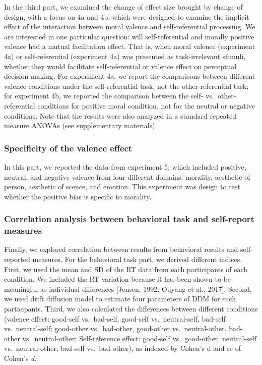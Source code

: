 \documentclass[
  man]{apa6}
\begin{document}
In the third part, we examined the change of effect size brought by change of design, with a focus on 4a and 4b, which were designed to examine the implicit effect of the interaction between moral valence and self-referential processing. We are interested in one particular question: will self-referential and morally positive valence had a mutual facilitation effect. That is, when moral valence (experiment 4a) or self-referential (experiment 4a) was presented as task-irrelevant stimuli, whether they would facilitate self-referential or valence effect on perceptual decision-making. For experiment 4a, we report the comparisons between different valence conditions under the self-referential task, not the other-referential task; for experiment 4b, we reported the comparison between the self- vs.~other-referential conditions for positive moral condition, not for the neutral or negative conditions. Note that the results were also analyzed in a standard repeated measure ANOVAs (see supplementary materials).

\hypertarget{specificity-of-the-valence-effect}{%
\subsubsection{Specificity of the valence effect}\label{specificity-of-the-valence-effect}}

In this part, we reported the data from experiment 5, which included positive, neutral, and negative valence from four different domains: morality, aesthetic of person, aesthetic of scence, and emotion. This experiment was design to test whether the positive bias is specific to morality.

\hypertarget{correlation-analysis-between-behavioral-task-and-self-report-measures}{%
\subsubsection{Correlation analysis between behavioral task and self-report measures}\label{correlation-analysis-between-behavioral-task-and-self-report-measures}}

Finally, we explored correlation between results from behavioral results and self-reported measures.
For the behavioral task part, we derived different indices. First, we used the mean and SD of the RT data from each participants of each condition. We included the RT variation because it has been shown to be meaningful as individual differences {[}Jensen, 1992; Ouyang et al., 2017{]}. Second, we used drift diffusion model to estimate four parameters of DDM for each participants. Third, we also calculated the differences between different conditions (valence effect: good-self vs.~bad-self, good-self vs.~neutral-self, bad-self vs.~neutral-self; good-other vs.~bad-other, good-other vs.~neutral-other, bad-other vs.~neutral-other; Self-reference effect: good-self vs.~good-other, neutral-self vs.~neutral-other, bad-self vs.~bad-other), as indexed by Cohen's d and se of Cohen's \emph{d}.
\end{document}

